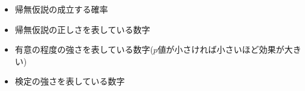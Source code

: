 \begin{itemize}
	\item 帰無仮説の成立する確率
	\item 帰無仮説の正しさを表している数字
	\item 有意の程度の強さを表している数字($p$値が小さければ小さいほど効果が大きい)
	\item 検定の強さを表している数字
\end{itemize}
